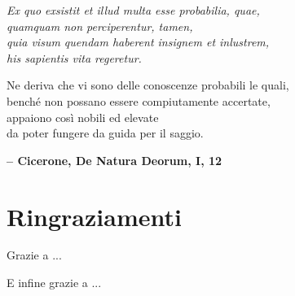 
\begin{flushright}
{
	\emph{
		Ex quo exsistit et illud multa esse probabilia, quae, \\
		quamquam non perciperentur, tamen, \\
		quia visum quendam haberent insignem et inlustrem, \\
		his sapientis vita regeretur. \\
	}

	\medskip

	Ne deriva che vi sono delle conoscenze probabili le quali, \\
	benché non possano essere compiutamente accertate, \\
	appaiono così nobili ed elevate \\
	da poter fungere da guida per il saggio. \\

	\medskip

	\textbf{-- Cicerone, De Natura Deorum, I, 12} 
}
\end{flushright}

\bigskip

\begingroup
\let\clearpage\relax
\let\cleardoublepage\relax
\let\cleardoublepage\relax
\chapter*{Ringraziamenti}

Grazie a ...

\bigskip

E infine grazie a ...

\endgroup
